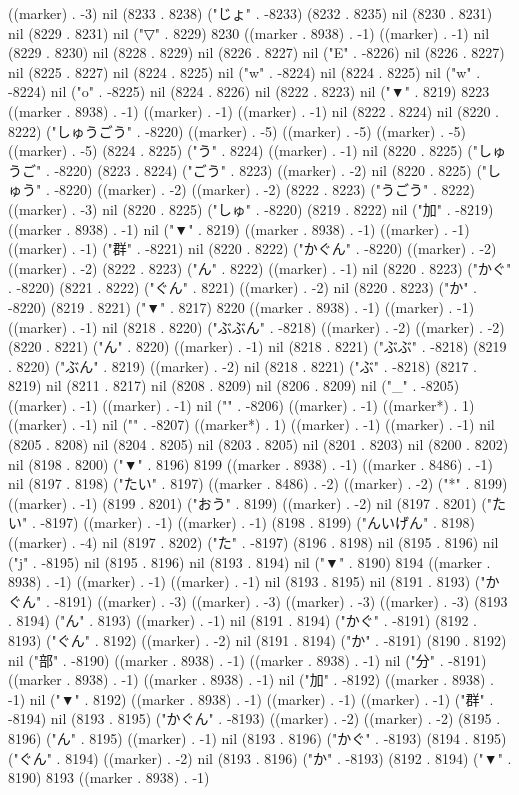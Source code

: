 ((marker) . -3) nil (8233 . 8238) ("じょ" . -8233) (8232 . 8235) nil (8230 . 8231) nil (8229 . 8231) nil ("▽" . 8229) 8230 ((marker . 8938) . -1) ((marker) . -1) nil (8229 . 8230) nil (8228 . 8229) nil (8226 . 8227) nil ("E" . -8226) nil (8226 . 8227) nil (8225 . 8227) nil (8224 . 8225) nil ("w" . -8224) nil (8224 . 8225) nil ("w" . -8224) nil ("o" . -8225) nil (8224 . 8226) nil (8222 . 8223) nil ("▼" . 8219) 8223 ((marker . 8938) . -1) ((marker) . -1) ((marker) . -1) nil (8222 . 8224) nil (8220 . 8222) ("しゅうごう" . -8220) ((marker) . -5) ((marker) . -5) ((marker) . -5) ((marker) . -5) (8224 . 8225) ("う" . 8224) ((marker) . -1) nil (8220 . 8225) ("しゅうご" . -8220) (8223 . 8224) ("ごう" . 8223) ((marker) . -2) nil (8220 . 8225) ("しゅう" . -8220) ((marker) . -2) ((marker) . -2) (8222 . 8223) ("うごう" . 8222) ((marker) . -3) nil (8220 . 8225) ("しゅ" . -8220) (8219 . 8222) nil ("加" . -8219) ((marker . 8938) . -1) nil ("▼" . 8219) ((marker . 8938) . -1) ((marker) . -1) ((marker) . -1) ("群" . -8221) nil (8220 . 8222) ("かぐん" . -8220) ((marker) . -2) ((marker) . -2) (8222 . 8223) ("ん" . 8222) ((marker) . -1) nil (8220 . 8223) ("かぐ" . -8220) (8221 . 8222) ("ぐん" . 8221) ((marker) . -2) nil (8220 . 8223) ("か" . -8220) (8219 . 8221) ("▼" . 8217) 8220 ((marker . 8938) . -1) ((marker) . -1) ((marker) . -1) nil (8218 . 8220) ("ぶぶん" . -8218) ((marker) . -2) ((marker) . -2) (8220 . 8221) ("ん" . 8220) ((marker) . -1) nil (8218 . 8221) ("ぶぶ" . -8218) (8219 . 8220) ("ぶん" . 8219) ((marker) . -2) nil (8218 . 8221) ("ぶ" . -8218) (8217 . 8219) nil (8211 . 8217) nil (8208 . 8209) nil (8206 . 8209) nil ("_" . -8205) ((marker) . -1) ((marker) . -1) nil ("{" . -8206) ((marker) . -1) ((marker*) . 1) ((marker) . -1) nil ("}" . -8207) ((marker*) . 1) ((marker) . -1) ((marker) . -1) nil (8205 . 8208) nil (8204 . 8205) nil (8203 . 8205) nil (8201 . 8203) nil (8200 . 8202) nil (8198 . 8200) ("▼" . 8196) 8199 ((marker . 8938) . -1) ((marker . 8486) . -1) nil (8197 . 8198) ("たい" . 8197) ((marker . 8486) . -2) ((marker) . -2) ("*" . 8199) ((marker) . -1) (8199 . 8201) ("おう" . 8199) ((marker) . -2) nil (8197 . 8201) ("たい" . -8197) ((marker) . -1) ((marker) . -1) (8198 . 8199) ("んいげん" . 8198) ((marker) . -4) nil (8197 . 8202) ("た" . -8197) (8196 . 8198) nil (8195 . 8196) nil ("j" . -8195) nil (8195 . 8196) nil (8193 . 8194) nil ("▼" . 8190) 8194 ((marker . 8938) . -1) ((marker) . -1) ((marker) . -1) nil (8193 . 8195) nil (8191 . 8193) ("かぐん" . -8191) ((marker) . -3) ((marker) . -3) ((marker) . -3) ((marker) . -3) (8193 . 8194) ("ん" . 8193) ((marker) . -1) nil (8191 . 8194) ("かぐ" . -8191) (8192 . 8193) ("ぐん" . 8192) ((marker) . -2) nil (8191 . 8194) ("か" . -8191) (8190 . 8192) nil ("部" . -8190) ((marker . 8938) . -1) ((marker . 8938) . -1) nil ("分" . -8191) ((marker . 8938) . -1) ((marker . 8938) . -1) nil ("加" . -8192) ((marker . 8938) . -1) nil ("▼" . 8192) ((marker . 8938) . -1) ((marker) . -1) ((marker) . -1) ("群" . -8194) nil (8193 . 8195) ("かぐん" . -8193) ((marker) . -2) ((marker) . -2) (8195 . 8196) ("ん" . 8195) ((marker) . -1) nil (8193 . 8196) ("かぐ" . -8193) (8194 . 8195) ("ぐん" . 8194) ((marker) . -2) nil (8193 . 8196) ("か" . -8193) (8192 . 8194) ("▼" . 8190) 8193 ((marker . 8938) . -1) 